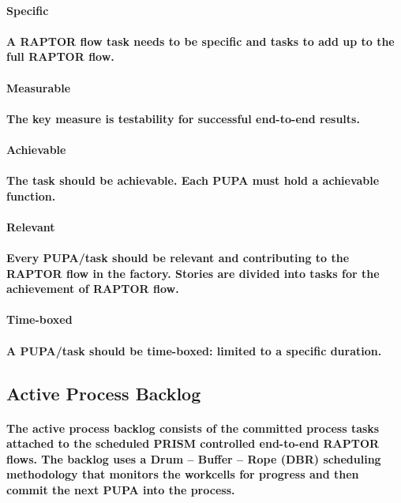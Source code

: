 \documentclass{acm_proc_article-sp}
\begin{document}
\paragraph{\textbf{Specific}}
\paragraph{A RAPTOR flow task needs to be specific and tasks to add up to the full RAPTOR flow.}
\paragraph{\textbf{Measurable}}
\paragraph{The key measure is testability for successful end-to-end results.}
\paragraph{\textbf{Achievable}}
\paragraph{The task should be achievable. Each PUPA must hold a achievable function.}
\paragraph{\textbf{Relevant}}
\paragraph{Every PUPA/task should be relevant and contributing to the RAPTOR flow in the factory. Stories are divided into tasks for the achievement of RAPTOR flow.}
\paragraph{\textbf{Time-boxed}}
\paragraph{A PUPA/task should be time-boxed: limited to a specific duration.}
\subsection{\textbf{Active Process Backlog}}
\paragraph{The active process backlog consists of the committed process tasks attached to the scheduled PRISM controlled end-to-end RAPTOR flows. The backlog uses a Drum – Buffer – Rope (DBR) scheduling methodology \cite{daniel1997scheduling} that monitors the workcells for progress and then commit the next PUPA into the process.}
\end{document}
